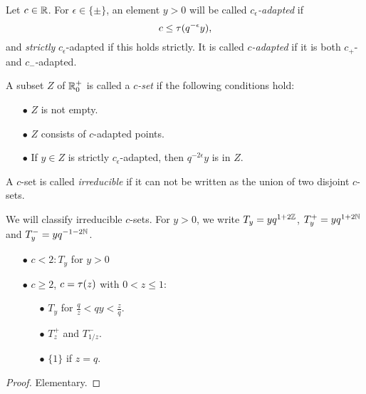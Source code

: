 \begin{Def}\label{DefAdapt} Let $c\in\mathbb{R}$. For $\epsilon \in \{\pm\}$, an element $y>0$ will be called \emph{$c_{\epsilon}$-adapted} if \begin{equation}\label{EqAd+} c \leq \operatorname{\tau}(q^{-\epsilon}y),\end{equation} and \emph{strictly} $c_{\epsilon}$-adapted if this holds strictly. It is called \emph{$c$-adapted} if it is both $c_+$- and $c_-$-adapted. 

A subset $Z$ of $\mathbb{R}^+_0$ is called a \emph{$c$-set} if the following conditions hold: \begin{itemize} 
\item[$\bullet$] $Z$ is not empty.
\item[$\bullet$] $Z$ consists of $c$-adapted points.
\item[$\bullet$] If $y\in Z$ is strictly $c_{\epsilon}$-adapted, then $q^{-2\epsilon}y$ is in $Z$.
\end{itemize}
A $c$-set is called \emph{irreducible} if it can not be written as the union of two disjoint $c$-sets.
\end{Def}

We will classify irreducible $c$-sets. For $y>0$, we write $T_y = yq^{1+2\mathbb{Z}}$, $T_y^+ = yq^{1+2\mathbb{N}}$ and $T_y^{-} = yq^{-1-2\mathbb{N}}$. 


\begin{Prop}\label{PropClass1D}

\begin{itemize} The following list exhausts all irreducible $c$-sets.
\item[$\bullet$] $c<2: T_y$ for $y>0$
\item[$\bullet$] $c \geq 2$, $c=\operatorname{\tau}(z)$ with $0 < z\leq 1$:
\begin{itemize}
\item[$\bullet$] $T_y$ for $\frac{q}{z}<qy<\frac{z}{q}$.
\item[$\bullet$] $T_{z}^+$ and $T_{1/z}^-$.
\item[$\bullet$] $\{1\}$ if $z=q$.
\end{itemize}
\end{itemize}
\end{Prop} 
\begin{proof} Elementary.
\end{proof} 

